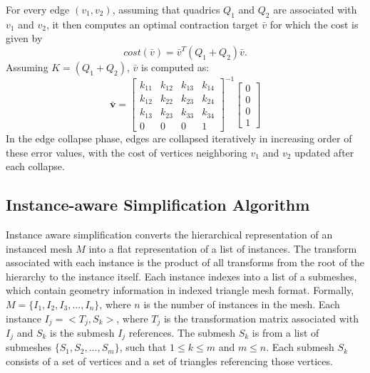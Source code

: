 For every edge $(v_1,v_2)$, assuming that quadrics
$Q_1$ and $Q_2$ are associated with
$v_1$ and $v_2$, it then computes an optimal
contraction target $\bar{v}$ for which the cost is given by
\begin{equation}
\label{eq:vbar_cost_equation}
cost(\bar{v}) = \bar{v}^T (Q_1+Q_2) \bar{v}. 
\end{equation}
Assuming $K = (Q_1+Q_2)$, $\bar{v}$ is
computed as:
\begin{equation}
\label{eq:vbar_equation}
 \mathbf{\bar{v}} = \left[ \begin{array}{cccc}
k_{11} & k_{12} & k_{13} & k_{14} \\
k_{12} & k_{22} & k_{23} & k_{24} \\
k_{13} & k_{23} & k_{33} & k_{34} \\
0 & 0 & 0 & 1                    \end{array} \right]^{-1}
\left[ \begin{array}{c}
0 \\
0 \\
0 \\
1                    \end{array} \right] 
\end{equation}
In the edge collapse phase, edges are collapsed iteratively in
increasing order of these error values, with the cost of vertices
neighboring $v_1$ and $v_2$ updated after each
collapse.

\subsection{Instance-aware Simplification Algorithm}
\label{sec:ias-algorithm}

Instance aware simplification converts the hierarchical representation
of an instanced mesh $M$ into a flat representation of a list of
instances. The transform associated with each instance is the product
of all transforms from the root of the hierarchy to the instance
itself. Each instance indexes into a list of a submeshes, which
contain geometry information in indexed triangle mesh format.
Formally, $M=\{I_1, I_2, I_3, ..., I_n\}$, where $n$ is the number of
instances in the mesh. Each instance $I_j=<T_j,S_k>$, where $T_j$ is
the transformation matrix associated with $I_j$ and $S_k$ is the
submesh $I_j$ references.  The submesh $S_k$ is from a list of
submeshes $\{S_1, S_2, ..., S_m\}$, such that $1 \le k \le m$ and $m
\le n$.  Each submesh $S_k$ consists of a set of vertices and a set of
triangles referencing those vertices.

